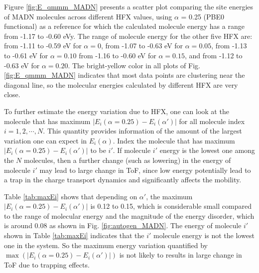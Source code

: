 \documentclass[%
 reprint,
superscriptaddress,
 amsmath,amssymb,
 aps,
prb,
floatfix
]{revtex4-2}
\begin{document}
Figure \ref{fig:E_qmmm_MADN} presents a scatter plot comparing the site energies of MADN molecules across different HFX values, using $\alpha$ = 0.25 (PBE0 functional) as a reference for which the calculated molecule energy has a range from -1.17 to -0.60 \unit[]{eV}y.
The range of molecule energy for the other five HFX are: 
from -1.11 to -0.59 \unit[]{eV} for $\alpha=0$, 
from -1.07 to -0.63 \unit[]{eV} for $\alpha=0.05$, 
from -1.13 to -0.61 \unit[]{eV} for $\alpha=0.10$
from -1.16 to -0.60 \unit[]{eV} for $\alpha=0.15$, 
and from -1.12 to -0.63 \unit[]{eV} for $\alpha=0.20$.
The bright-yellow color in all plots of Fig. \ref{fig:E_qmmm_MADN} indicates that most data points are clustering near the diagonal line, so the molecular energies calculated by different HFX are very close.



To further estimate the energy variation due to HFX, one can look at the molecule that has maximum $|E_i(\alpha=0.25) - E_i(\alpha')|$ for all molecule index $i=1,2,\cdots,N$. 
This quantity provides information of the amount of the largest variation one can expect in $E_i(\alpha)$. Index the molecule that has maximum $|E_i(\alpha=0.25) - E_i(\alpha')|$ to be $i'$. 
If molecule $i'$ energy is the lowest one among the $N$ molecules, then a further change (such as lowering) in the energy of molecule $i'$ may lead to large change in ToF, since low energy potentially lead to a trap in the charge transport dynamics and significantly affects the mobility. 

Table \ref{tab:maxEi} shows that depending on $\alpha'$, the maximum $|E_i(\alpha=0.25) - E_i(\alpha')|$ is 0.12 to 0.15, which is considerable small compared to the range of molecular energy and the magnitude of the energy disorder, which is around 0.08 as shown in Fig. \ref{fig:autogen_MADN}. 
The energy of molecule $i'$ shown in Table \ref{tab:maxEi} indicates that the $i'$ molecule energy is not the lowest one in the system. So the maximum energy variation quantified by $\max(|E_i(\alpha=0.25) - E_i(\alpha')|)$ is not likely to results in large change in ToF due to trapping effects. 
\end{document}
